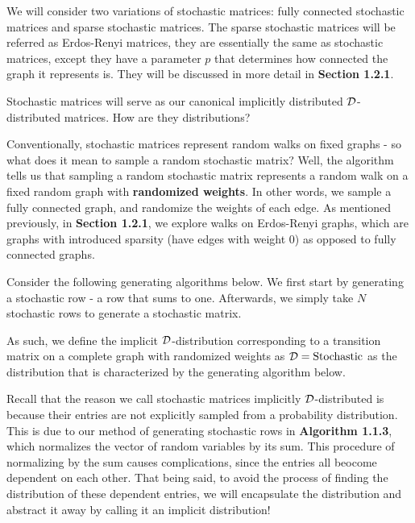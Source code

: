 We will consider two variations of stochastic matrices: fully connected stochastic matrices and sparse stochastic matrices.
The sparse stochastic matrices will be referred as Erdos-Renyi matrices, they are essentially the same as stochastic matrices, except they have a parameter $p$ that
determines how connected the graph it represents is. They will be discussed in more detail in \textbf{Section 1.2.1}.


Stochastic matrices will serve as our canonical implicitly distributed $\mathcal{D}$-distributed matrices. How are they distributions?

Conventionally, stochastic matrices represent random walks on fixed graphs - so what does it mean to sample a random stochastic matrix?
Well, the algorithm tells us that sampling a random stochastic matrix represents a random walk on a fixed random graph with \textbf{randomized weights}.
In other words, we sample a fully connected graph, and randomize the weights of each edge. As mentioned previously, in \textbf{Section 1.2.1}, we explore walks on Erdos-Renyi graphs,
which are graphs with introduced sparsity (have edges with weight 0) as opposed to fully connected graphs.

Consider the following generating algorithms below. We first start by generating a stochastic row - a row that sums to one. Afterwards, we simply take $N$ stochastic rows to generate a stochastic matrix.

\ALGstochrow

As such, we define the implicit $\mathcal{D}$-distribution corresponding to a transition matrix on a complete graph with randomized weights as $\mathcal{D} = \text{Stochastic}$ as the distribution that
is characterized by the generating algorithm below.

\ALGstoch

\begin{remark}
Recall that the reason we call stochastic matrices implicitly $\mathcal{D}$-distributed is because their entries are not explicitly sampled from a probability distribution.
This is due to our method of generating stochastic rows in \textbf{Algorithm 1.1.3}, which normalizes the vector of random variables by its sum. This procedure of normalizing by the sum causes complications, since the entries all beocome dependent on each other.
That being said, to avoid the process of finding the distribution of these dependent entries, we will encapsulate the distribution and abstract it away by calling it an implicit distribution!
\end{remark}

